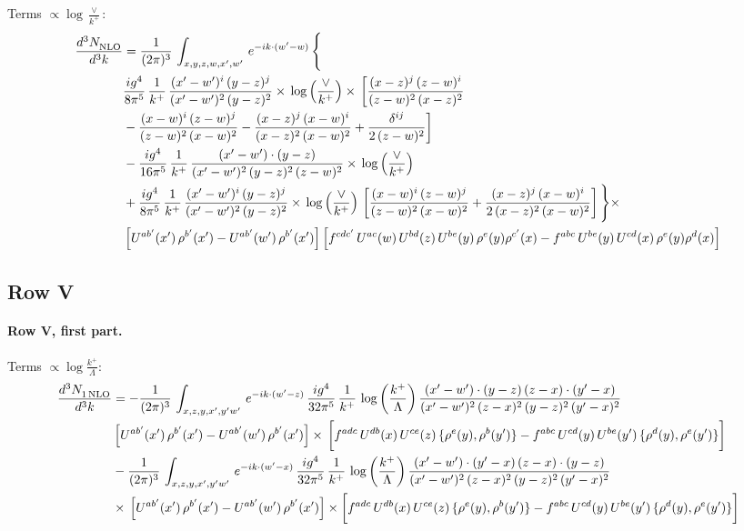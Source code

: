 \documentclass[10pt]{article}
\numberwithin{equation}{section}
\begin{document}
\noindent Terms $\propto\log\frac{\vee}{k^+}$:
\begin{align}
    \frac{d^{3}N_{\rm NLO}^{\rm}}{d^{3}k}  & =   \frac{1}{(2\pi)^{3}}\,
    \int_{x,y,z,w,x',w'}\,e^{-ik\cdot (w^\prime-w)}\,\Bigg\{\notag \\
& \frac{ig^{4}}{8\pi^{5}}\,\frac{1}{k^{+}}\,\frac{(x'-w')^{i}\,(y-z)^{j}}{(x'-w')^{2}\,(y-z)^{2}}\times\,\log{\left(\frac{\vee}{k^{+}}\right)}\times\, \bigg[\frac{(x-z)^{j}\,(z-w)^{i}}{(z-w)^{2}\,(x-z)^{2}}\notag \\ & -\frac{(x-w)^{i}\,(z-w)^{j}}{(z-w)^{2}\,(x-w)^{2}}-\frac{(x-z)^{j}\,(x-w)^{i}}{(x-z)^{2}\,(x-w)^{2}}+\frac{\delta^{ij}}{2\,(z-w)^{2}}\bigg] \notag \\
& -\frac{ig^{4}}{16\pi^{5}}\,\frac{1}{k^{+}}\,\frac{(x'-w')\cdot (y-z)}{(x'-w')^{2}\,(y-z)^{2}\,(z-w)^{2}}\times\,\log{\left(\frac{\vee}{k^{+}}\right)} \notag \\
& + \frac{ig^{4}}{8\pi^{5}}\,\frac{1}{k^{+}}\,\frac{(x'-w')^{i}\,(y-z)^{j}}{(x'-w')^{2}\,(y-z)^{2}}\times\,\log{\left(\frac{\vee}{k^{+}}\right)}\,\left[\frac{(x-w)^{i}\,(z-w)^{j}}{(z-w)^{2}\,(x-w)^{2}}+\frac{(x-z)^{j}\,(x-w)^{i}}{2\, (x-z)^{2}\,(x-w)^{2}}\right]\Bigg\}\times\notag \\ &  \left[U^{ab'}(x')\,\rho^{b'}(x')-U^{ab'}(w')\,\rho^{b'}(x')\right] \left[f^{cdc'}\,U^{ac}(w)\,U^{bd}(z)\,U^{be}(y)\,\rho^{e}(y)\rho^{c'}(x)-f^{abc}\,U^{be}(y)\,U^{cd}(x)\,\rho^{e}(y)\rho^{d}(x)\right] \label{eq:B:G1IV}
\end{align}

\subsection{Row V}
\paragraph{Row V, first part.}
\noindent Terms $\propto\log\frac{k^+}{\Lambda}$:
\begin{align}
     \frac{d^{3}N_{1\,\rm NLO}^{\rm}}{d^{3}k}  & =   -\frac{1}{(2\pi)^{3}}\, \int_{x,z,y,x',y'w'}\,e^{-ik\cdot (w^\prime-z)}\,\frac{ig^{4}}{32\pi^{5}}\, \frac{1}{k^{+}}\,\log{\left(\frac{k^{+}}{\Lambda}\right)}\,\frac{(x'-w')\cdot (y-z)\,(z-x)\cdot (y'-x)}{(x'-w')^{2}\,(z-x)^{2}\,(y-z)^{2}\,(y'-x)^{2}}\,\notag \\ & \left[U^{ab'}(x')\,\rho^{b'}(x')-U^{ab'}(w')\,\rho^{b'}(x')\right]\times\, \bigg[f^{adc}\,U^{db}(x)\,U^{ce}(z)\, \{\rho^{e}(y),\rho^{b}(y')\}-f^{abc}\,U^{cd}(y)\,U^{be}(y')\, \{\rho^{d}(y),\rho^{e}(y')\}\bigg] \notag \\
&  -\frac{1}{(2\pi)^{3}}\, \int_{x,z,y,x',y'w'}\,e^{-ik\cdot (w^\prime-x)}\,\frac{ig^{4}}{32\pi^{5}}\, \frac{1}{k^{+}}\,\log{\left(\frac{k^{+}}{\Lambda}\right)}\,\frac{(x'-w')\cdot (y'-x)\,(z-x)\cdot (y-z)}{(x'-w')^{2}\,(z-x)^{2}\,(y-z)^{2}\,(y'-x)^{2}}\notag \\ & \times\, \left[U^{ab'}(x')\,\rho^{b'}(x')-U^{ab'}(w')\,\rho^{b'}(x')\right]\times \bigg[f^{adc}\,U^{db}(x)\,U^{ce}(z)\, \{\rho^{e}(y),\rho^{b}(y')\}-f^{abc}\,U^{cd}(y)\,U^{be}(y')\, \{\rho^{d}(y),\rho^{e}(y')\}\bigg] \label{eq:J:G1V1}
\end{align}
\end{document}
